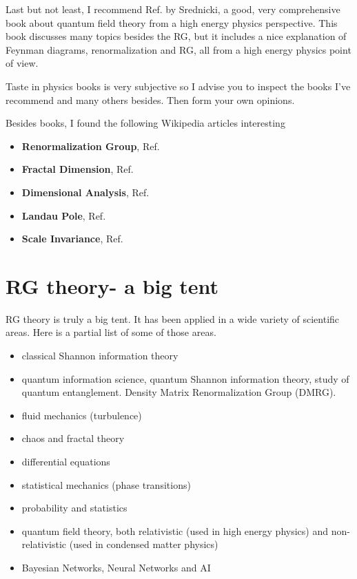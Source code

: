 Last but not least,
I recommend Ref.\cite{Sr}
by Srednicki,
a good, very comprehensive
 book about
quantum field theory from
a high energy
physics perspective.
This book discusses many topics
besides the RG, but it
includes a nice
explanation of
Feynman diagrams,
renormalization and RG,
all from a high energy
physics point of view.


Taste in physics books is very subjective so
I advise you to inspect the books
I've recommend
and many others besides. Then
form your own opinions.

Besides books, I 
found the following 
Wikipedia articles interesting

\begin{itemize}

\item {\bf Renormalization Group},
Ref.\cite{wiki-rg}

\item {\bf Fractal Dimension},
Ref. \cite{wiki-fractal}

\item {\bf Dimensional Analysis},
Ref.\cite{wiki-da}

\item {\bf Landau Pole},
Ref.\cite{wiki-landau-pole}

\item {\bf Scale Invariance},
Ref.\cite{wiki-scale-inv}


\end{itemize}


\section{RG theory- a big tent}

RG theory is
truly a big tent.
It has been applied in
a wide variety of scientific areas.
Here is a partial list of some of
those areas. 

\begin{itemize}
\item classical Shannon information theory
\item quantum information science, quantum
Shannon information theory,
study of quantum entanglement.
Density Matrix Renormalization Group (DMRG).
\item
fluid mechanics (turbulence)
\item
chaos and fractal theory
\item
differential equations
\item
statistical mechanics (phase transitions)
\item
probability and statistics
\item
quantum field theory,
both relativistic (used
in high energy physics) and
non-relativistic (used in condensed matter
physics)
\item Bayesian Networks, Neural Networks and AI
\end{itemize}

